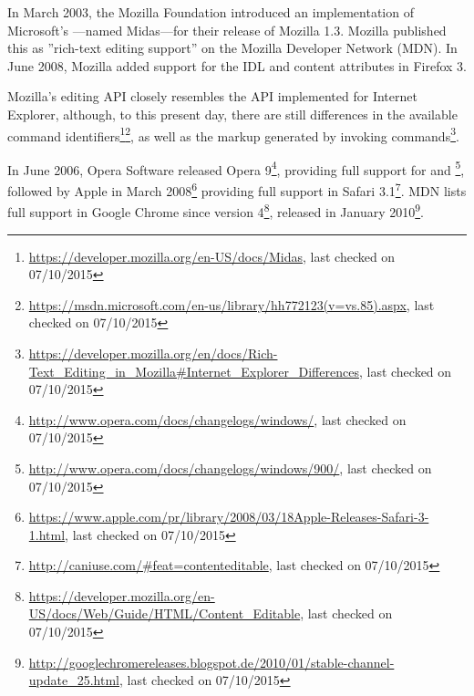 In March 2003, the Mozilla Foundation introduced an implementation of Microsoft's ---named Midas---for their release of Mozilla 1.3. Mozilla published this as ''rich-text editing support'' on the Mozilla Developer Network (MDN)\cite{ak}. In June 2008, Mozilla added support for the  IDL and  content attributes in Firefox 3. 


Mozilla's editing API closely resembles the API implemented for Internet Explorer, although, to this present day, there are still differences in the available command identifiers\footnote{\url{https://developer.mozilla.org/en-US/docs/Midas}, last checked on 07/10/2015}\footnote{\url{https://msdn.microsoft.com/en-us/library/hh772123(v=vs.85).aspx}, last checked on 07/10/2015}, as well as the markup generated by invoking commands\footnote{\url{https://developer.mozilla.org/en/docs/Rich-Text\_Editing\_in\_Mozilla\#Internet\_Explorer\_Differences}, last checked on 07/10/2015}. 




In June 2006, Opera Software released Opera 9\footnote{\url{http://www.opera.com/docs/changelogs/windows/}, last checked on 07/10/2015}, providing full support for  and \footnote{\url{http://www.opera.com/docs/changelogs/windows/900/}, last checked on 07/10/2015}, followed by Apple in March 2008\footnote{\url{https://www.apple.com/pr/library/2008/03/18Apple-Releases-Safari-3-1.html}, last checked on 07/10/2015} providing full support in Safari 3.1\footnote{\url{http://caniuse.com/\#feat=contenteditable}, last checked on 07/10/2015}. MDN lists full support in Google Chrome since version 4\footnote{\url{https://developer.mozilla.org/en-US/docs/Web/Guide/HTML/Content\_Editable}, last checked on 07/10/2015}, released in January 2010\footnote{\url{http://googlechromereleases.blogspot.de/2010/01/stable-channel-update\_25.html}, last checked on 07/10/2015}.

